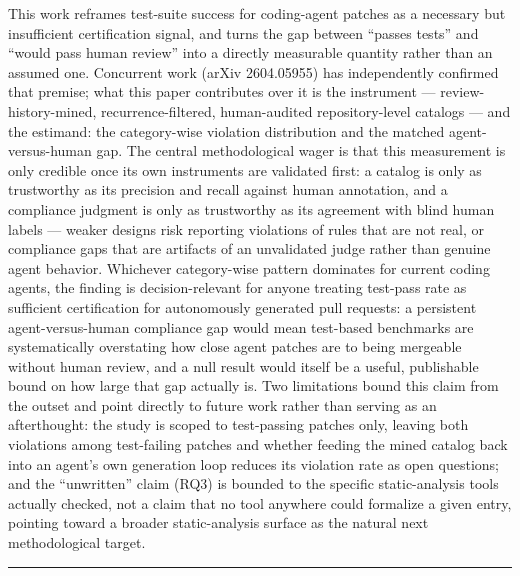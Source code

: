 \documentclass[11pt]{article}
\begin{document}
This work reframes test-suite success for coding-agent patches as a necessary but insufficient certification signal, and turns the gap between ``passes tests'' and ``would pass human review'' into a directly measurable quantity rather than an assumed one. Concurrent work (arXiv 2604.05955) has independently confirmed that premise; what this paper contributes over it is the instrument --- review-history-mined, recurrence-filtered, human-audited repository-level catalogs --- and the estimand: the category-wise violation distribution and the matched agent-versus-human gap. The central methodological wager is that this measurement is only credible once its own instruments are validated first: a catalog is only as trustworthy as its precision and recall against human annotation, and a compliance judgment is only as trustworthy as its agreement with blind human labels --- weaker designs risk reporting violations of rules that are not real, or compliance gaps that are artifacts of an unvalidated judge rather than genuine agent behavior. Whichever category-wise pattern dominates for current coding agents, the finding is decision-relevant for anyone treating test-pass rate as sufficient certification for autonomously generated pull requests: a persistent agent-versus-human compliance gap would mean test-based benchmarks are systematically overstating how close agent patches are to being mergeable without human review, and a null result would itself be a useful, publishable bound on how large that gap actually is. Two limitations bound this claim from the outset and point directly to future work rather than serving as an afterthought: the study is scoped to test-passing patches only, leaving both violations among test-failing patches and whether feeding the mined catalog back into an agent's own generation loop reduces its violation rate as open questions; and the ``unwritten'' claim (RQ3) is bounded to the specific static-analysis tools actually checked, not a claim that no tool anywhere could formalize a given entry, pointing toward a broader static-analysis surface as the natural next methodological target.

\vspace{1em}
\hrule
\vspace{1em}
\end{document}
